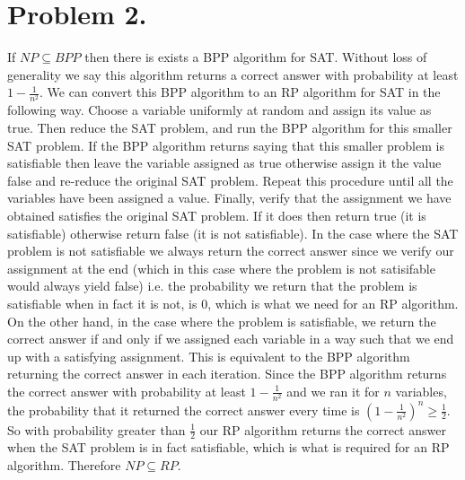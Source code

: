 \documentclass[12pt]{article}
\begin{document}
\section*{Problem 2.}

If $NP \subseteq BPP$ then there is exists a BPP algorithm for SAT. Without
loss of generality we say this algorithm returns a correct answer with probability
at least $1 - \frac{1}{n^2}$. We can convert this BPP algorithm to an RP
algorithm for SAT in the following way. Choose a variable uniformly at random
and assign its value as true. Then reduce the SAT problem, and run the BPP
algorithm for this smaller SAT problem. If the BPP algorithm returns saying that this smaller
problem is satisfiable then leave the variable assigned as true otherwise assign
it the value false and re-reduce the original SAT problem. Repeat this procedure
until all the variables have been assigned a value. Finally, verify that the
assignment we have obtained satisfies the original SAT problem. If it does then
return true (it is satisfiable) otherwise return false (it is not satisfiable).
In the case where the SAT problem is not satisfiable we always return the correct
answer since we verify our assignment at the end (which in this case where the
problem is not satisifable would always yield false) i.e. the probability we
return that the problem is satisfiable when in fact it is not, is 0, which is what
we need for an RP algorithm. On the other hand, in the case where the problem is
satisfiable, we return the correct answer if and only if we assigned each variable
in a way such that we end up with a satisfying assignment. This is equivalent to
the BPP algorithm returning the correct answer in each iteration. Since the BPP
algorithm returns the correct answer with probability at least
$1 - \frac{1}{n^2}$ and we ran it for $n$ variables, the probability that it
returned the correct answer every time is
$(1 - \frac{1}{n^2})^n \ge \frac{1}{2}$. So with probability greater than
$\frac{1}{2}$ our RP algorithm returns the correct answer when the SAT problem
is in fact satisfiable, which is what is required for an RP algorithm.
Therefore $NP \subseteq RP$.
\end{document}
